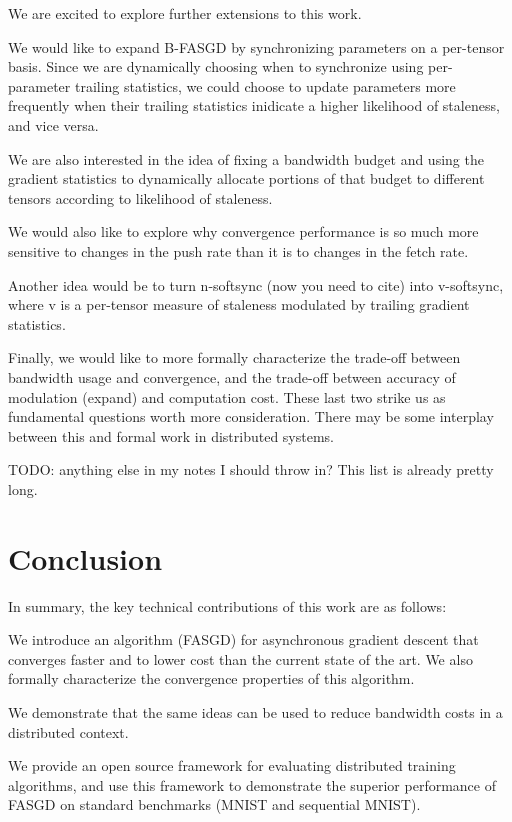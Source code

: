 \documentclass{article} %
\begin{document}
We are excited to explore further extensions to this work.

We would like to expand B-FASGD by synchronizing parameters on a per-tensor basis.
Since we are dynamically choosing when to synchronize using per-parameter trailing statistics,
we could choose to update parameters more frequently when their trailing statistics
inidicate a higher likelihood of staleness, and vice versa.

We are also interested in the idea of fixing a bandwidth budget and using the gradient
statistics to dynamically allocate portions of that budget to different tensors
according to likelihood of staleness.

We would also like to explore why convergence performance is so much more sensitive
to changes in the push rate than it is to changes in the fetch rate.

Another idea would be to turn n-softsync (now you need to cite) into v-softsync,
where v is a per-tensor measure of staleness modulated by trailing gradient statistics.

Finally, we would like to more formally characterize the trade-off between bandwidth usage and convergence,
and the trade-off between accuracy of modulation (expand) and computation cost.
These last two strike us as fundamental questions worth more consideration.
There may be some interplay between this and formal work in distributed systems.

TODO: anything else in my notes I should throw in?
This list is already pretty long.

\vspace{-2.5mm}
\section{Conclusion}
\vspace{-1mm}
In summary, the key technical contributions of this work are as follows:

We introduce an algorithm (FASGD) for asynchronous gradient descent that converges faster and to lower cost than
the current state of the art. We also formally characterize the convergence properties of this algorithm.

We demonstrate that the same ideas can be used to reduce bandwidth costs in a distributed context.

We provide an open source framework for evaluating distributed training algorithms, and use this
framework to demonstrate the superior performance of FASGD on standard benchmarks (MNIST and sequential MNIST).
\end{document}
